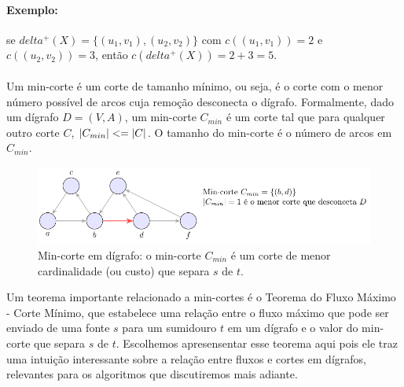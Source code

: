 \documentclass[12pt,a4paper]{article}
\def\leq{\string<=}%
\def\delta{delta}%
\begin{document}
\paragraph{Exemplo:} se \(\delta^+(X)=\{(u_1,v_1),(u_2,v_2)\}\) com \(c((u_1,v_1))=2\) e \(c((u_2,v_2))=3\), então \(c(\delta^+(X))=2+3=5\).

\paragraph{}
Um min-corte é um corte de tamanho mínimo, ou seja, é o corte com o menor número possível de arcos cuja remoção desconecta o dígrafo. Formalmente, dado um dígrafo \(D = (V, A)\), um min-corte \(C_{min}\) é um corte tal que para qualquer outro corte \(C\), \(|C_{min}| \leq |C|\). O tamanho do min-corte é o número de arcos em \(C_{min}\).


\begin{figure}[H]
    \centering
    \includegraphics[width=0.9\linewidth]{figures/fig_min_corte.pdf}

    \caption{Min-corte em dígrafo: o min-corte $C_{min}$ é um corte de menor cardinalidade (ou custo) que separa $s$ de $t$.}
    \label{fig:min-corte}
    \end{figure}


Um teorema importante relacionado a min-cortes é o Teorema do Fluxo Máximo - Corte Mínimo, que estabelece uma relação entre o fluxo máximo que pode ser enviado de uma fonte \(s\) para um sumidouro \(t\) em um dígrafo e o valor do min-corte que separa \(s\) de \(t\). Escolhemos apresensentar esse teorema aqui pois ele traz uma intuição interessante sobre a relação entre fluxos e cortes em dígrafos, relevantes para os algoritmos que discutiremos mais adiante.
\end{document}
